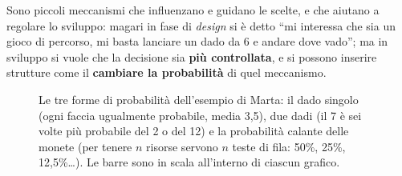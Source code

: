 Sono piccoli meccanismi che influenzano e guidano le scelte, e che aiutano a regolare lo
sviluppo: magari in fase di \emph{design} si è detto ``mi interessa che sia un gioco di
percorso, mi basta lanciare un dado da 6 e andare dove vado''; ma in sviluppo si vuole che la
decisione sia \textbf{più controllata}, e si possono inserire strutture come il
\textbf{cambiare la probabilità} di quel meccanismo.

\begin{figure}[htbp]
\centering
{}
\caption{Le tre forme di probabilità dell'esempio di Marta: il dado singolo (ogni faccia
ugualmente probabile, media 3,5), due dadi (il 7 è sei volte più probabile del 2 o del 12) e la
probabilità calante delle monete (per tenere $n$ risorse servono $n$ teste di fila: 50\%,
25\%, 12,5\%\ldots). Le barre sono in scala all'interno di ciascun grafico.}
\label{a14:fig:dadi}
\end{figure}

